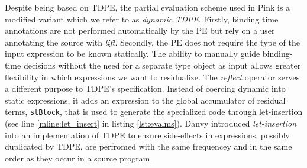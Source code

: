 \documentclass[a4paper,12pt,twoside,openright]{report}
\theoremstyle{definition}
\newcommand{\mslang}{$\lambda_{\uparrow\downarrow}$}
\begin{document}
Despite being based on TDPE, the partial evaluation scheme used in Pink is a modified variant which we refer to as \textit{dynamic TDPE}. Firstly, binding time annotations are not performed automatically by the PE but rely on a user annotating the source with \textit{lift}. Secondly, the PE does not require the type of the input expression to be known statically. The ability to manually guide binding-time decisions without the need for a separate type object as input allows greater flexibility in which expressions we want to residualize. The \textit{reflect} operator serves a different purpose to TDPE's specification. Instead of coercing dynamic into static expressions, it adds an expression to the global accumulator of residual terms, \texttt{stBlock}, that is used to generate the specialized code through let-insertion (see line \ref{mline:let_insert} in listing \ref{lst:evalms}). Danvy introduced \textit{let-insertion} into an implementation of TDPE \cite{hatcliff2007partial} to ensure side-effects in expressions, possibly duplicated by TDPE, are perfromed with the same frequencey and in the same order as they occur in a source program.
\end{document}
